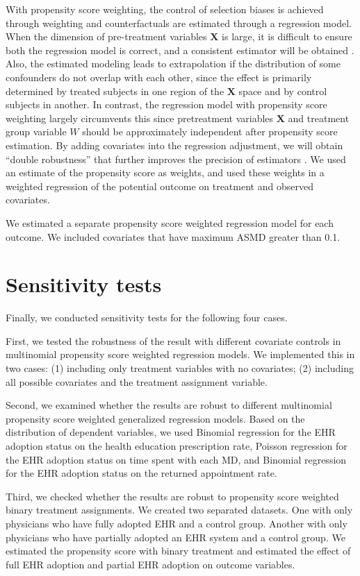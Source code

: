 \documentclass[12pt]{report}
\begin{document}
With propensity score weighting, the control of selection biases is achieved through weighting and counterfactuals are estimated through a regression model. When the dimension of pre-treatment variables $\textbf{X}$ is large, it is difficult to ensure both the regression model is correct, and a consistent estimator will be obtained \citep{rubin1997estimating}. Also, the estimated modeling leads to extrapolation if the distribution of some confounders do not overlap with each other, since the effect is primarily determined by treated subjects in one region of the $\textbf{X}$ space and by control subjects in another. In contrast, the regression model with propensity score weighting largely circumvents this since pretreatment variables $\textbf{X}$ and treatment group variable $W$ should be approximately independent after propensity score estimation. By adding covariates into the regression adjustment, we will obtain ``double robustness'' that further improves the precision of estimators \citep{lunceford2004stratification}. We used an estimate of the propensity score as weights, and used these weights in a weighted regression of the potential outcome on treatment and observed covariates.

We estimated a separate propensity score weighted regression model for each outcome. We included covariates that have maximum ASMD greater than 0.1. 

\section{Sensitivity tests}
\label{sec:spec}
Finally, we conducted sensitivity tests for the following four cases.

First, we tested the robustness of the result with different covariate controls in multinomial propensity score weighted regression models. We implemented this in two cases: (1) including only treatment variables with no covariates; (2) including all possible covariates and the treatment assignment variable.

Second, we examined whether the results are robust to different multinomial propensity score weighted generalized regression models. Based on the distribution of dependent variables, we used Binomial regression for the EHR adoption status on the health education prescription rate, Poisson regression for the EHR adoption status on time spent with each MD, and Binomial regression for the EHR adoption status on the returned appointment rate.

Third, we checked whether the results are robust to propensity score weighted binary treatment assignments. We created two separated datasets. One with only physicians who have fully adopted EHR and a control group. Another with only physicians who have partially adopted an EHR system and a control group. We estimated the propensity score with binary treatment and estimated the effect of full EHR adoption and partial EHR adoption on outcome variables.
\end{document}
